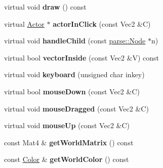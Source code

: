 \begin{DoxyCompactItemize}
\item 
\hypertarget{classg2c_1_1_node_a8778eb7b0d15a763a2d08815f92dfadb}{
virtual void {\bfseries draw} () const }
\label{classg2c_1_1_node_a8778eb7b0d15a763a2d08815f92dfadb}

\item 
\hypertarget{classg2c_1_1_node_af161518b302eee61afa0b9a5e96923df}{
virtual \hyperlink{classg2c_1_1_actor}{Actor} $\ast$ {\bfseries actorInClick} (const Vec2 \&C)}
\label{classg2c_1_1_node_af161518b302eee61afa0b9a5e96923df}

\item 
\hypertarget{classg2c_1_1_node_ae14520472896031136193b8976b95bac}{
virtual void {\bfseries handleChild} (const \hyperlink{classparse_1_1_node}{parse::Node} $\ast$n)}
\label{classg2c_1_1_node_ae14520472896031136193b8976b95bac}

\item 
\hypertarget{classg2c_1_1_node_a5b31987b395473e03e7452ec6a2c79ff}{
virtual bool {\bfseries vectorInside} (const Vec2 \&V) const }
\label{classg2c_1_1_node_a5b31987b395473e03e7452ec6a2c79ff}

\item 
\hypertarget{classg2c_1_1_node_a6cffd425eec0487e34656e2508ce16ab}{
virtual void {\bfseries keyboard} (unsigned char inkey)}
\label{classg2c_1_1_node_a6cffd425eec0487e34656e2508ce16ab}

\item 
\hypertarget{classg2c_1_1_node_ab60d344a72277e988af8ae0fbf54702c}{
virtual bool {\bfseries mouseDown} (const Vec2 \&C)}
\label{classg2c_1_1_node_ab60d344a72277e988af8ae0fbf54702c}

\item 
\hypertarget{classg2c_1_1_node_ae0117e82bf9a1d74cdacd15678eed7b9}{
virtual void {\bfseries mouseDragged} (const Vec2 \&C)}
\label{classg2c_1_1_node_ae0117e82bf9a1d74cdacd15678eed7b9}

\item 
\hypertarget{classg2c_1_1_node_a949ef66d4179a36e1034774c11f1ce9a}{
virtual void {\bfseries mouseUp} (const Vec2 \&C)}
\label{classg2c_1_1_node_a949ef66d4179a36e1034774c11f1ce9a}

\item 
\hypertarget{classg2c_1_1_node_a737ac72d9d9306e96acaf9e1d2414699}{
const Mat4 \& {\bfseries getWorldMatrix} () const }
\label{classg2c_1_1_node_a737ac72d9d9306e96acaf9e1d2414699}

\item 
\hypertarget{classg2c_1_1_node_a401c52db6a1457bdbf1c3a1e5ffa5ece}{
const \hyperlink{classg2c_1_1_color}{Color} \& {\bfseries getWorldColor} () const }
\label{classg2c_1_1_node_a401c52db6a1457bdbf1c3a1e5ffa5ece}

\end{DoxyCompactItemize}
